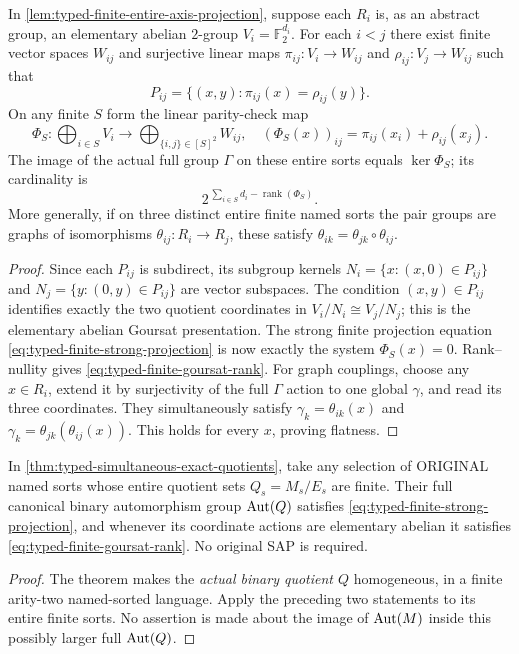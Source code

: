 \begin{corollary}
\label{cor:typed-finite-linear-goursat}
In \cref{lem:typed-finite-entire-axis-projection}, suppose
each $R_i$ is, as an abstract group, an elementary
abelian $2$-group $V_i=\mathbb F_2^{d_i}$.
For each $i<j$ there exist finite vector spaces
$W_{ij}$ and surjective linear maps
$\pi_{ij}:V_i\to W_{ij}$ and
$\rho_{ij}:V_j\to W_{ij}$ such that
\[
 P_{ij}=\{(x,y):\pi_{ij}(x)=\rho_{ij}(y)\}.
\]
On any finite $S$ form the linear parity-check map
\[
 \Phi_S:\bigoplus_{i\in S}V_i
 \longrightarrow\bigoplus_{\{i,j\}\in[S]^2}W_{ij},
 \quad
 (\Phi_S(x))_{ij}=\pi_{ij}(x_i)+\rho_{ij}(x_j).
\]
The image of the actual full group $\Gamma$ on these
entire sorts equals $\ker\Phi_S$; its cardinality is
\[
 2^{\,\sum_{i\in S}d_i-\operatorname{rank}(\Phi_S)}.
 \tag{TQ4}\label{eq:typed-finite-goursat-rank}
\]
More generally, if on three distinct entire finite
named sorts the pair groups are graphs of isomorphisms
$\theta_{ij}:R_i\to R_j$, these satisfy
$\theta_{ik}=\theta_{jk}\circ\theta_{ij}$.
\end{corollary}
\begin{proof}
Since each $P_{ij}$ is subdirect, its subgroup kernels
$N_i=\{x:(x,0)\in P_{ij}\}$ and
$N_j=\{y:(0,y)\in P_{ij}\}$ are vector subspaces.
The condition $(x,y)\in P_{ij}$ identifies exactly
the two quotient coordinates in
$V_i/N_i\cong V_j/N_j$; this is the elementary
abelian Goursat presentation. The strong finite
projection equation \eqref{eq:typed-finite-strong-projection}
is now exactly the system $\Phi_S(x)=0$.
Rank--nullity gives \eqref{eq:typed-finite-goursat-rank}.
For graph couplings, choose any $x\in R_i$, extend
it by surjectivity of the full $\Gamma$ action to
one global $\gamma$, and read its three coordinates.
They simultaneously satisfy
$\gamma_k=\theta_{ik}(x)$ and
$\gamma_k=\theta_{jk}(\theta_{ij}(x))$.
This holds for every $x$, proving flatness.
\end{proof}

\begin{corollary}
\label{cor:typed-exact-finite-axis-goursat}
In \cref{thm:typed-simultaneous-exact-quotients}, take
any selection of ORIGINAL named sorts whose entire
quotient sets $Q_s=M_s/E_s$ are finite. Their full
canonical binary automorphism group $\operatorname{Aut}(Q)$ satisfies
\eqref{eq:typed-finite-strong-projection}, and whenever
its coordinate actions are elementary abelian it
satisfies \eqref{eq:typed-finite-goursat-rank}.
No original SAP is required.
\end{corollary}
\begin{proof}
The theorem makes the \emph{actual binary quotient $Q$}
homogeneous, in a finite arity-two named-sorted language.
Apply the preceding two statements to its entire finite
sorts. No assertion is made about the image of
$\operatorname{Aut}(M)$ inside this possibly larger full $\operatorname{Aut}(Q)$.
\end{proof}


